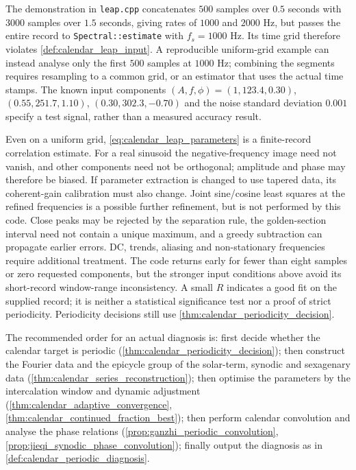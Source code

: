 \begin{remark}\label{rem:calendar_leap_limits}
The demonstration in \texttt{leap.cpp} concatenates \(500\) samples over \(0.5\) seconds with \(3000\) samples over \(1.5\) seconds, giving rates of \(1000\) and \(2000\) Hz, but passes the entire record to \texttt{Spectral::estimate} with \(f_s=1000\) Hz. Its time grid therefore violates \cref{def:calendar_leap_input}. A reproducible uniform-grid example can instead analyse only the first \(500\) samples at \(1000\) Hz; combining the segments requires resampling to a common grid, or an estimator that uses the actual time stamps. The known input components \((A,f,\phi)=(1,123.4,0.30)\), \((0.55,251.7,1.10)\), \((0.30,302.3,-0.70)\) and the noise standard deviation \(0.001\) specify a test signal, rather than a measured accuracy result.

Even on a uniform grid, \cref{eq:calendar_leap_parameters} is a finite-record correlation estimate. For a real sinusoid the negative-frequency image need not vanish, and other components need not be orthogonal; amplitude and phase may therefore be biased. If parameter extraction is changed to use tapered data, its coherent-gain calibration must also change. Joint sine/cosine least squares at the refined frequencies is a possible further refinement, but is not performed by this code. Close peaks may be rejected by the separation rule, the golden-section interval need not contain a unique maximum, and a greedy subtraction can propagate earlier errors. DC, trends, aliasing and non-stationary frequencies require additional treatment. The code returns early for fewer than eight samples or zero requested components, but the stronger input conditions above avoid its short-record window-range inconsistency. A small \(R\) indicates a good fit on the supplied record; it is neither a statistical significance test nor a proof of strict periodicity. Periodicity decisions still use \cref{thm:calendar_periodicity_decision}.
\end{remark}

\begin{remark}\label{rem:calendar_integration_order}
The recommended order for an actual diagnosis is: first decide whether the calendar target is periodic (\cref{thm:calendar_periodicity_decision}); then construct the Fourier data and the epicycle group of the solar-term, synodic and sexagenary data (\cref{thm:calendar_series_reconstruction}); then optimise the parameters by the intercalation window and dynamic adjustment (\cref{thm:calendar_adaptive_convergence}, \cref{thm:calendar_continued_fraction_best}); then perform calendar convolution and analyse the phase relations (\cref{prop:ganzhi_periodic_convolution}, \cref{prop:jieqi_synodic_phase_convolution}); finally output the diagnosis as in \cref{def:calendar_periodic_diagnosis}.
\end{remark}

